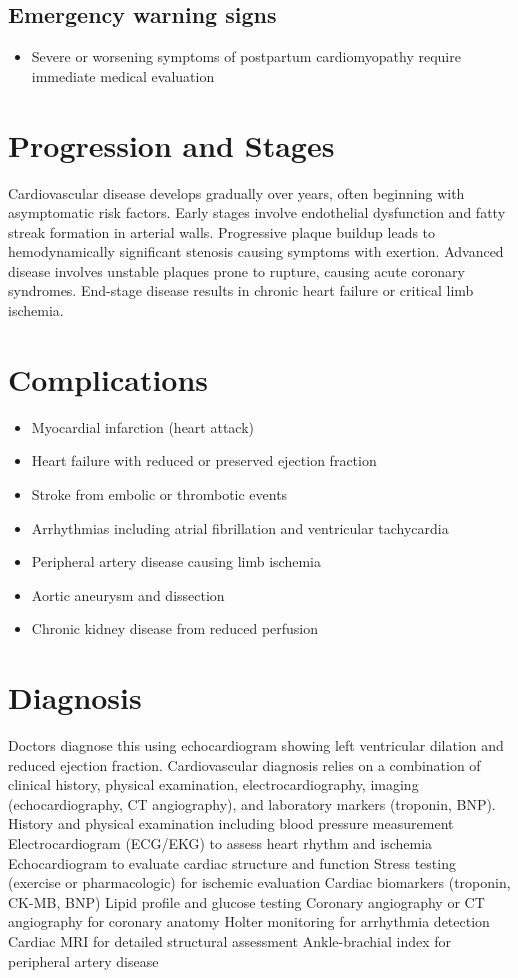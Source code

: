 \subsection{Emergency warning signs}
\begin{itemize}[noitemsep]
  \item Severe or worsening symptoms of postpartum cardiomyopathy require immediate medical evaluation
\end{itemize}
\section{Progression and Stages}
Cardiovascular disease develops gradually over years, often beginning with asymptomatic risk factors. Early stages involve endothelial dysfunction and fatty streak formation in arterial walls. Progressive plaque buildup leads to hemodynamically significant stenosis causing symptoms with exertion. Advanced disease involves unstable plaques prone to rupture, causing acute coronary syndromes. End-stage disease results in chronic heart failure or critical limb ischemia.
\section{Complications}
\begin{itemize}[noitemsep]
  \item Myocardial infarction (heart attack)
  \item Heart failure with reduced or preserved ejection fraction
  \item Stroke from embolic or thrombotic events
  \item Arrhythmias including atrial fibrillation and ventricular tachycardia
  \item Peripheral artery disease causing limb ischemia
  \item Aortic aneurysm and dissection
  \item Chronic kidney disease from reduced perfusion
\end{itemize}
\section{Diagnosis}
Doctors diagnose this using echocardiogram showing left ventricular dilation and reduced ejection fraction. Cardiovascular diagnosis relies on a combination of clinical history, physical examination, electrocardiography, imaging (echocardiography, CT angiography), and laboratory markers (troponin, BNP). History and physical examination including blood pressure measurement Electrocardiogram (ECG/EKG) to assess heart rhythm and ischemia Echocardiogram to evaluate cardiac structure and function Stress testing (exercise or pharmacologic) for ischemic evaluation Cardiac biomarkers (troponin, CK-MB, BNP) Lipid profile and glucose testing Coronary angiography or CT angiography for coronary anatomy Holter monitoring for arrhythmia detection Cardiac MRI for detailed structural assessment Ankle-brachial index for peripheral artery disease


